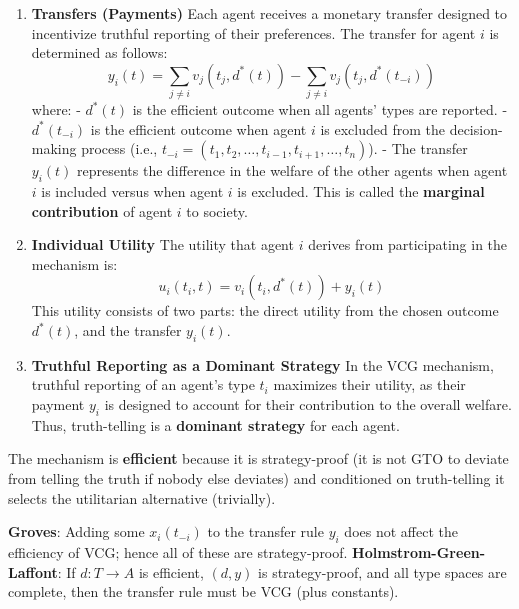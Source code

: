 \documentclass[10pt]{scrartcl}
\newcommand{\vocab}[1]{\textbf{\color{blue} #1}}
\begin{document}
\begin{multicols*}{2}
\begin{enumerate}
        \item \vocab{Transfers (Payments)}
        Each agent receives a monetary transfer designed to incentivize truthful reporting of their preferences. The transfer for agent \( i \) is determined as follows:
        \[
        y_i(t) = \sum_{j \neq i} v_j(t_j, d^*(t)) - \sum_{j \neq i} v_j(t_j, d^*(t_{-i}))
        \]
        where:
        - \( d^*(t) \) is the efficient outcome when all agents' types are reported.
        - \( d^*(t_{-i}) \) is the efficient outcome when agent \( i \) is excluded from the decision-making process (i.e., \( t_{-i} = (t_1, t_2, \dots, t_{i-1}, t_{i+1}, \dots, t_n) \)).
        - The transfer \( y_i(t) \) represents the difference in the welfare of the other agents when agent \( i \) is included versus when agent \( i \) is excluded. This is called the \vocab{marginal contribution} of agent \( i \) to society.

        \item \vocab{Individual Utility}
        The utility that agent \( i \) derives from participating in the mechanism is:
        \[
        u_i(t_i, t) = v_i(t_i, d^*(t)) + y_i(t)
        \]
        This utility consists of two parts: the direct utility from the chosen outcome \( d^*(t) \), and the transfer \( y_i(t) \).

        \item \vocab{Truthful Reporting as a Dominant Strategy}
        In the VCG mechanism, truthful reporting of an agent's type \( t_i \) maximizes their utility, as their payment \( y_i \) is designed to account for their contribution to the overall welfare. Thus, truth-telling is a \vocab{dominant strategy} for each agent.
    \end{enumerate}
    The mechanism is \vocab{efficient} because it is strategy-proof (it is not GTO
    to deviate from telling the truth if nobody else deviates) and conditioned on
    truth-telling it selects the utilitarian alternative (trivially).

    \vocab{Groves}: Adding some $x_i(t_{-i})$ to the transfer rule $y_i$ does not
    affect the efficiency of VCG; hence all of these are strategy-proof.
    \vocab{Holmstrom-Green-Laffont}: If $d:T\to A$ is efficient, $(d,y)$ is
    strategy-proof, and all type spaces are complete, then the transfer rule must be
    VCG (plus constants).


\end{multicols*}
\end{document}
